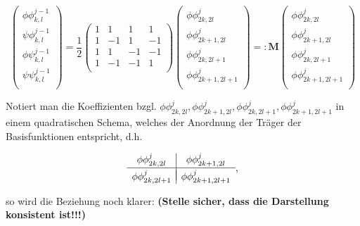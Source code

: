 \documentclass{article}
\begin{document}
\[
\begin{pmatrix}
\phi\phi_{k,l}^{j-1} \\
\psi\phi_{k,l}^{j-1} \\
\phi\psi_{k,l}^{j-1} \\
\psi\psi_{k,l}^{j-1} \\
\end{pmatrix}
= \frac{1}{2}
\begin{pmatrix}
1 & 1 & 1 & 1 \\
1 & -1 & 1 & -1 \\
1 & 1 & -1 & -1 \\
1 & -1 & -1 & 1 \\
\end{pmatrix}
\begin{pmatrix}
\phi\phi_{2k,2l}^{j} \\
\phi\phi_{2k+1,2l}^{j} \\
\phi\phi_{2k,2l+1}^{j} \\
\phi\phi_{2k+1,2l+1}^{j} \\
\end{pmatrix}
=:
\mathbf{M}
\begin{pmatrix}
\phi\phi_{2k,2l}^{j} \\
\phi\phi_{2k+1,2l}^{j} \\
\phi\phi_{2k,2l+1}^{j} \\
\phi\phi_{2k+1,2l+1}^{j} \\
\end{pmatrix}
\]

\noindent Notiert man die Koeffizienten bzgl. $\phi\phi_{2k,2l}^{j}, \phi\phi_{2k+1,2l}^{j}, \phi\phi_{2k,2l+1}^{j}, \phi\phi_{2k+1,2l+1}^{j}$ in einem quadratischen Schema, welches der Anordnung der Träger der Basisfunktionen entspricht, d.h.

\[
\begin{array}{c|c}
\phi\phi_{2k,2l}^{j} & \phi\phi_{2k+1,2l}^{j} \\[.05cm] 
\hline \\[-0.35cm]
\phi\phi_{2k,2l+1}^{j} & \phi\phi_{2k+1,2l+1}^{j}
\end{array}
,
\]

\noindent so wird die Beziehung noch klarer: \textbf{(Stelle sicher, dass die Darstellung konsistent ist!!!)}
\end{document}
